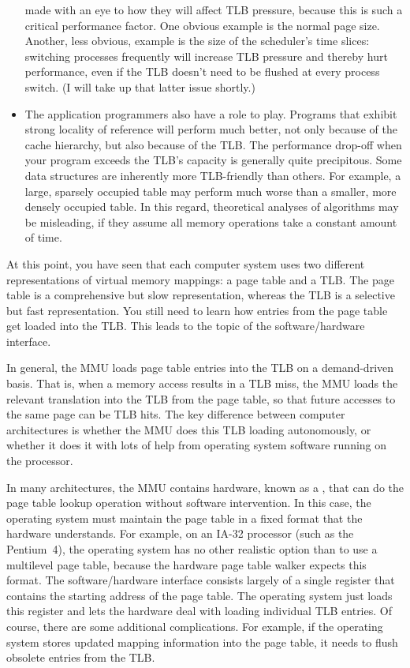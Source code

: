 \begin{itemize}
made with an eye to how they will affect TLB pressure, because this is
such a critical performance factor.  One obvious example is the normal
page size.  Another, less obvious, example is the size of the
scheduler's time slices: switching processes frequently will increase
TLB pressure and thereby hurt performance, even if the TLB doesn't need
to be flushed at every process switch. (I will take up that latter
issue shortly.)
\item
The application programmers also have a role to play.  Programs that
exhibit strong locality of reference will perform much better, not
only because of the cache hierarchy, but also because of the TLB.  The
performance drop-off when your program exceeds the TLB's capacity is
generally quite precipitous.  Some data structures are inherently more
TLB-friendly than others.  For example, a large,
sparsely occupied table may perform much worse than a smaller, more
densely occupied table.  In this regard, theoretical analyses of
algorithms may be misleading, if they assume all memory operations
take a constant amount of time.
\end{itemize}

At this point, you have seen that each computer system uses two
different representations of virtual memory mappings: a page table and
a TLB.  The page table is a comprehensive but slow representation,
whereas the TLB is a selective but fast representation.  You still need
to learn how entries from the page table get loaded into the TLB.  This
leads to the topic of the software/hardware interface.

In general, the MMU loads page table entries into the TLB on a
demand-driven basis.  That is, when a memory access results in a TLB
miss, the MMU loads the relevant translation into the TLB from the
page table, so that future accesses to the same page can be TLB hits.
The key difference between computer architectures is whether the MMU
does this TLB loading autonomously, or whether it does it with lots of
help from operating system software running on the processor.

In many architectures, the MMU contains hardware, known as a , that can do the page table lookup operation without
software intervention.  In this case, the operating system must
maintain the page table in a fixed format that the hardware
understands.  For example, on an IA-32 processor (such as the
Pentium~4), the operating system has no other realistic option than to
use a multilevel page table, because the hardware page table walker
expects this format.  The software/hardware interface consists largely
of a single register that contains the starting address of the page
table.  The operating system just loads this register and lets the
hardware deal with loading individual TLB entries.  Of course, there
are some additional complications.  For example, if the operating
system stores updated mapping information into the page table, it
needs to flush obsolete entries from the TLB.

